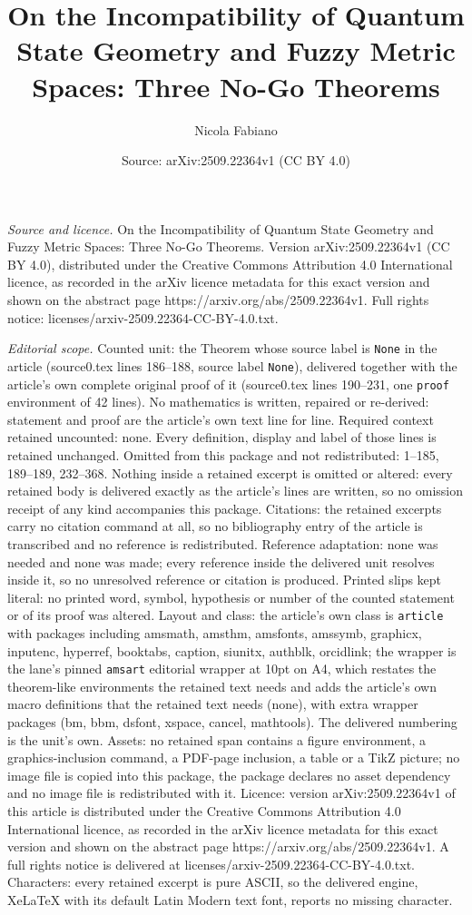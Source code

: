 \documentclass[10pt,a4paper]{amsart}
\title[On the Incompatibility of Quantum State Geometry and Fuzzy M]{On the Incompatibility of Quantum State Geometry and Fuzzy Metric Spaces: Three No-Go Theorems}
\author{Nicola Fabiano}
\date{Source: arXiv:2509.22364v1 (CC BY 4.0)}
\begin{document}
\maketitle

\noindent\emph{Source and licence.} On the Incompatibility of Quantum State Geometry and Fuzzy Metric Spaces: Three No-Go Theorems. Version arXiv:2509.22364v1 (CC BY 4.0), distributed under the Creative Commons Attribution 4.0 International licence, as recorded in the arXiv licence metadata for this exact version and shown on the abstract page https://arxiv.org/abs/2509.22364v1. Full rights notice: licenses/arxiv-2509.22364-CC-BY-4.0.txt.\par\smallskip

\noindent\textit{Editorial scope.} Counted unit: the Theorem whose source label is \texttt{None} in the article (source0.tex lines 186--188, source label \texttt{None}), delivered together with the article's own complete original proof of it (source0.tex lines 190--231, one \texttt{proof} environment of 42 lines). No mathematics is written, repaired or re-derived: statement and proof are the article's own text line for line. Required context retained uncounted: none. Every definition, display and label of those lines is retained unchanged. Omitted from this package and not redistributed: 1--185, 189--189, 232--368. Nothing inside a retained excerpt is omitted or altered: every retained body is delivered exactly as the article's lines are written, so no omission receipt of any kind accompanies this package. Citations: the retained excerpts carry no citation command at all, so no bibliography entry of the article is transcribed and no reference is redistributed. Reference adaptation: none was needed and none was made; every reference inside the delivered unit resolves inside it, so no unresolved reference or citation is produced. Printed slips kept literal: no printed word, symbol, hypothesis or number of the counted statement or of its proof was altered. Layout and class: the article's own class is \texttt{article} with packages including amsmath, amsthm, amsfonts, amssymb, graphicx, inputenc, hyperref, booktabs, caption, siunitx, authblk, orcidlink; the wrapper is the lane's pinned \texttt{amsart} editorial wrapper at 10pt on A4, which restates the theorem-like environments the retained text needs and adds the article's own macro definitions that the retained text needs (none), with extra wrapper packages (bm, bbm, dsfont, xspace, cancel, mathtools). The delivered numbering is the unit's own. Assets: no retained span contains a figure environment, a graphics-inclusion command, a PDF-page inclusion, a table or a TikZ picture; no image file is copied into this package, the package declares no asset dependency and no image file is redistributed with it. Licence: version arXiv:2509.22364v1 of this article is distributed under the Creative Commons Attribution 4.0 International licence, as recorded in the arXiv licence metadata for this exact version and shown on the abstract page https://arxiv.org/abs/2509.22364v1. A full rights notice is delivered at licenses/arxiv-2509.22364-CC-BY-4.0.txt. Characters: every retained excerpt is pure ASCII, so the delivered engine, XeLaTeX with its default Latin Modern text font, reports no missing character.
\end{document}
